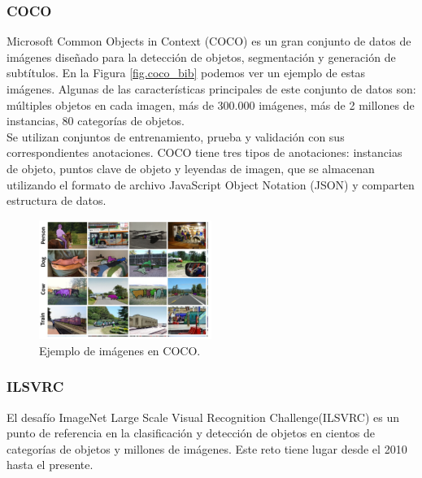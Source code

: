 \documentclass{bmvc2k}
\begin{document}
\subsubsection{COCO}

Microsoft Common Objects in Context (COCO) es un gran conjunto de datos de imágenes diseñado para la detección de objetos, segmentación y generación de subtítulos. En la Figura \ref{fig.coco_bib} podemos ver un ejemplo de estas imágenes. Algunas de las características principales de este conjunto de datos son: múltiples objetos en cada imagen, más de 300.000 imágenes, más de 2 millones de instancias, 80 categorías de objetos.\\

Se utilizan conjuntos de entrenamiento, prueba y validación con sus correspondientes anotaciones. COCO tiene tres tipos de anotaciones: instancias de objeto, puntos clave de objeto y leyendas de imagen, que se almacenan utilizando el formato de archivo JavaScript Object Notation (JSON) y comparten estructura de datos.\\

\begin{figure}
\begin{center}
	\includegraphics[width=0.5\textwidth]{images/COCO.png}
   \caption{Ejemplo de imágenes en COCO.}
	\label{fig.coco}
\end{center}
\end{figure}


\subsubsection{ILSVRC}

El desafío ImageNet Large Scale Visual Recognition Challenge(ILSVRC) es un punto de referencia en la clasificación y detección de objetos en cientos de categorías de objetos y millones de imágenes. Este reto tiene lugar desde el 2010 hasta el presente.\\
\end{document}
